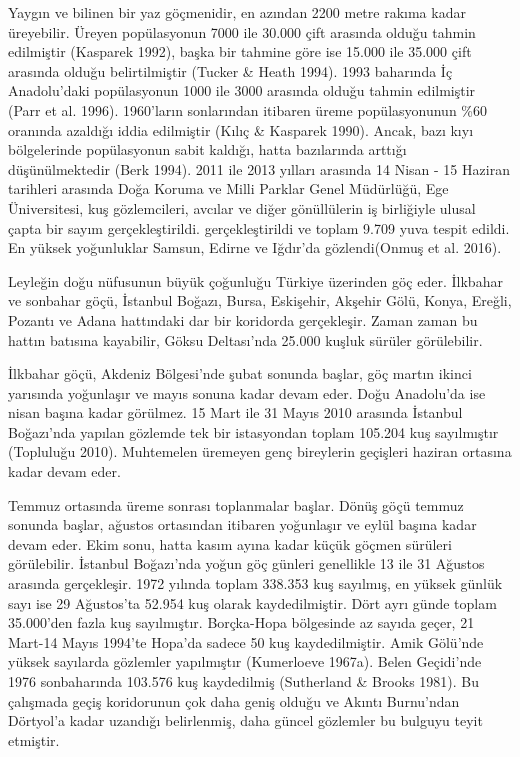 \documentclass[
  letterpaper,
  DIV=11,
  numbers=noendperiod]{scrreprt}
\begin{document}
Yaygın ve bilinen bir yaz göçmenidir, en azından 2200 metre rakıma kadar
üreyebilir. Üreyen popülasyonun 7000 ile 30.000 çift arasında olduğu
tahmin edilmiştir (Kasparek 1992), başka bir tahmine göre ise 15.000 ile
35.000 çift arasında olduğu belirtilmiştir (Tucker \& Heath 1994). 1993
baharında İç Anadolu'daki popülasyonun 1000 ile 3000 arasında olduğu
tahmin edilmiştir (Parr et al. 1996). 1960'ların sonlarından itibaren
üreme popülasyonunun \%60 oranında azaldığı iddia edilmiştir (Kılıç \&
Kasparek 1990). Ancak, bazı kıyı bölgelerinde popülasyonun sabit
kaldığı, hatta bazılarında arttığı düşünülmektedir (Berk 1994). 2011 ile
2013 yılları arasında 14 Nisan - 15 Haziran tarihleri arasında Doğa
Koruma ve Milli Parklar Genel Müdürlüğü, Ege Üniversitesi, kuş
gözlemcileri, avcılar ve diğer gönüllülerin iş birliğiyle ulusal çapta
bir sayım gerçekleştirildi. gerçekleştirildi ve toplam 9.709 yuva tespit
edildi. En yüksek yoğunluklar Samsun, Edirne ve Iğdır'da gözlendi(Onmuş
et al. 2016).

Leyleğin doğu nüfusunun büyük çoğunluğu Türkiye üzerinden göç eder.
İlkbahar ve sonbahar göçü, İstanbul Boğazı, Bursa, Eskişehir, Akşehir
Gölü, Konya, Ereğli, Pozantı ve Adana hattındaki dar bir koridorda
gerçekleşir. Zaman zaman bu hattın batısına kayabilir, Göksu Deltası'nda
25.000 kuşluk sürüler görülebilir.

İlkbahar göçü, Akdeniz Bölgesi'nde şubat sonunda başlar, göç martın
ikinci yarısında yoğunlaşır ve mayıs sonuna kadar devam eder. Doğu
Anadolu'da ise nisan başına kadar görülmez. 15 Mart ile 31 Mayıs 2010
arasında İstanbul Boğazı'nda yapılan gözlemde tek bir istasyondan toplam
105.204 kuş sayılmıştır (Topluluğu 2010). Muhtemelen üremeyen genç
bireylerin geçişleri haziran ortasına kadar devam eder.

Temmuz ortasında üreme sonrası toplanmalar başlar. Dönüş göçü temmuz
sonunda başlar, ağustos ortasından itibaren yoğunlaşır ve eylül başına
kadar devam eder. Ekim sonu, hatta kasım ayına kadar küçük göçmen
sürüleri görülebilir. İstanbul Boğazı'nda yoğun göç günleri genellikle
13 ile 31 Ağustos arasında gerçekleşir. 1972 yılında toplam 338.353 kuş
sayılmış, en yüksek günlük sayı ise 29 Ağustos'ta 52.954 kuş olarak
kaydedilmiştir. Dört ayrı günde toplam 35.000'den fazla kuş sayılmıştır.
Borçka-Hopa bölgesinde az sayıda geçer, 21 Mart-14 Mayıs 1994'te Hopa'da
sadece 50 kuş kaydedilmiştir. Amik Gölü'nde yüksek sayılarda gözlemler
yapılmıştır (Kumerloeve 1967a). Belen Geçidi'nde 1976 sonbaharında
103.576 kuş kaydedilmiş (Sutherland \& Brooks 1981). Bu çalışmada geçiş
koridorunun çok daha geniş olduğu ve Akıntı Burnu'ndan Dörtyol'a kadar
uzandığı belirlenmiş, daha güncel gözlemler bu bulguyu teyit etmiştir.
\end{document}
